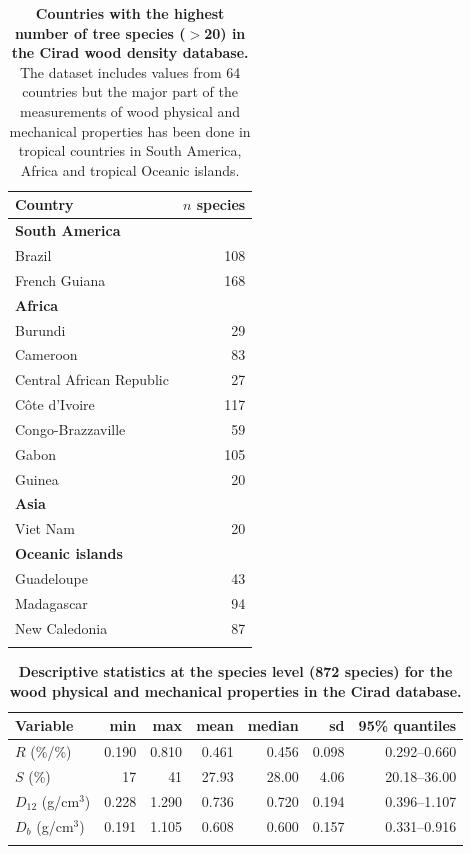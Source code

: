 \documentclass[a4paper, 12pt, leqno, dvipsnames]{article}\usepackage[]{graphicx}\usepackage[]{color}
\begin{document}


\vfill
  \begin{longtable}{@{}lr@{}} 
    \caption{\textbf{Countries with the highest number of tree species ($>$20) in the
      Cirad wood density database.} The dataset includes values from 64 countries but the major
    part of the measurements of wood physical and mechanical properties has been done in tropical
    countries in South America, Africa and tropical Oceanic islands.}\label{tab:Countries}\\
    \toprule
    Country & $n$ species \\
    \midrule
    \textbf{South America} & ~ \\ 
    Brazil & 108 \\
    French Guiana & 168 \\
    \textbf{Africa} & ~ \\
    Burundi & 29 \\
    Cameroon & 83 \\
    Central African Republic & 27 \\
    Côte d'Ivoire & 117 \\
    Congo-Brazzaville & 59 \\
    Gabon & 105 \\
    Guinea & 20 \\
    \textbf{Asia} & ~ \\
    Viet Nam & 20 \\
    \textbf{Oceanic islands} & ~ \\
    Guadeloupe & 43 \\
    Madagascar & 94 \\
    New Caledonia & 87 \\
    \bottomrule\\
  \end{longtable}
\vfill

\newpage

  \begin{longtable}{@{}lrrrrrr@{}} 
    \caption{\textbf{Descriptive statistics at the species level (872 species) for the
      wood physical and mechanical properties in the Cirad database.}}\label{tab:Stat}\\
    \toprule
    Variable & min & max & mean & median & sd & 95\% quantiles \\
    \midrule
    $R$ (\%/\%) & 0.190 & 0.810 & 0.461 & 0.456 & 0.098 & 0.292--0.660 \\
    $S$ (\%) & 17 & 41 & 27.93 & 28.00 & 4.06 & 20.18--36.00 \\
    $D_{12}$ (g/cm$^3$) & 0.228 & 1.290 & 0.736 & 0.720 & 0.194 & 0.396--1.107 \\
    $D_b$ (g/cm$^3$) &  0.191 & 1.105 & 0.608 & 0.600 & 0.157 & 0.331--0.916 \\
    \bottomrule\\
  \end{longtable}
\end{document}

